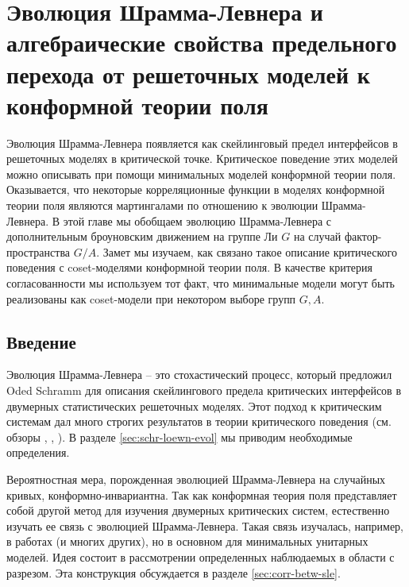 
\chapter{Эволюция Шрамма-Левнера и алгебраические свойства предельного перехода от решеточных моделей к конформной теории поля}
\label{sec:SLE}

Эволюция Шрамма-Левнера появляется как скейлинговый предел интерфейсов в решеточных моделях в критической точке. Критическое поведение этих моделей можно описывать при помощи минимальных моделей конформной теории поля. Оказывается, что некоторые корреляционные функции в моделях конформной теории поля являются мартингалами по отношению к эволюции Шрамма-Левнера. 
В этой главе мы обобщаем эволюцию Шрамма-Левнера с дополнительным броуновским движением на группе Ли  $G$ на случай фактор-пространства $G/A$. Замет мы изучаем, как связано такое описание критического поведения с coset-моделями конформной теории поля. В качестве критерия согласованности мы используем тот факт, что минимальные модели могут быть реализованы как coset-модели при некотором выборе групп $G, A$.

\section{Введение}
Эволюция Шрамма-Левнера -- это стохастический процесс, который предложил Oded Schramm  \cite{schramm2000scaling} для описания скейлингового предела критических интерфейсов в двумерных статистических решеточных моделях. Этот подход к критическим системам дал много строгих результатов в теории критического поведения (см. обзоры  \cite{rohde2005basic}, \cite{bauer20062d}, \cite{Cardy:2005kh}). В разделе \ref{sec:schr-loewn-evol} мы приводим необходимые определения.  

Вероятностная мера, порожденная эволюцией Шрамма-Левнера на случайных кривых, конформно-инвариантна. Так как конформная теория поля представляет собой другой метод для изучения двумерных критических систем, естественно изучать ее связь с эволюцией Шрамма-Левнера. Такая связь изучалась, например, в работах \cite{bauer2004conformal,bauer2004cfts,bauer2003sle,bauer2002sle} (и многих других), но в основном для минимальных унитарных моделей. 
Идея состоит в рассмотрении определенных наблюдаемых в области с разрезом. Эта конструкция обсуждается в разделе \ref{sec:corr-betw-sle}. 


